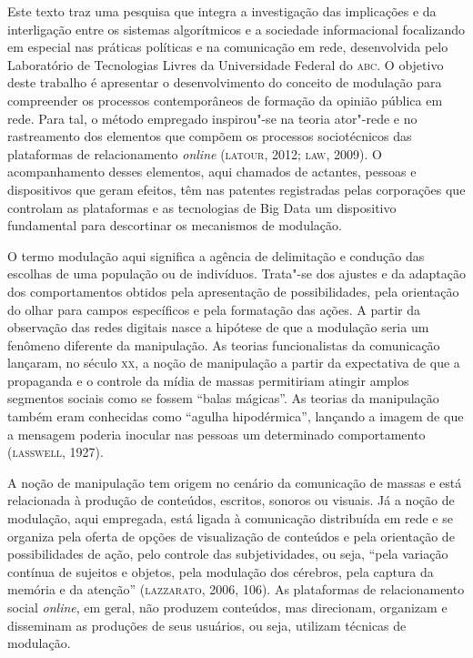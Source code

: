 \begin{flushright}
\end{flushright}

\noindent{}Este texto traz uma pesquisa que integra a investigação das implicações
e da interligação entre os sistemas algorítmicos e a sociedade
informacional focalizando em especial nas práticas políticas e na
comunicação em rede, desenvolvida pelo Laboratório de Tecnologias Livres
da Universidade Federal do \textsc{abc}. O objetivo deste trabalho é apresentar o
desenvolvimento do conceito de modulação para compreender os processos
contemporâneos de formação da opinião pública em rede. Para tal, o
método empregado inspirou"-se na teoria ator"-rede e no rastreamento dos
elementos que compõem os processos sociotécnicos das plataformas de
relacionamento \emph{online} (\textsc{latour}, 2012; \textsc{law}, 2009). O acompanhamento
desses elementos, aqui chamados de actantes, pessoas e dispositivos que
geram efeitos, têm nas patentes registradas pelas corporações que
controlam as plataformas e as tecnologias de Big Data um dispositivo
fundamental para descortinar os mecanismos de modulação.

O termo modulação aqui significa a agência de delimitação e condução das
escolhas de uma população ou de indivíduos. Trata"-se dos ajustes e da
adaptação dos comportamentos obtidos pela apresentação de
possibilidades, pela orientação do olhar para campos específicos e pela
formatação das ações. A partir da observação das redes digitais nasce a
hipótese de que a modulação seria um fenômeno diferente da manipulação.
As teorias funcionalistas da comunicação lançaram, no século \textsc{xx}, a noção
de manipulação a partir da expectativa de que a propaganda e o controle
da mídia de massas permitiriam atingir amplos segmentos sociais como se
fossem ``balas mágicas''. As teorias da manipulação também eram
conhecidas como ``agulha hipodérmica'', lançando a imagem de que a
mensagem poderia inocular nas pessoas um determinado comportamento
(\textsc{lasswell}, 1927).

A noção de manipulação tem origem no cenário da comunicação de massas e
está relacionada à produção de conteúdos, escritos, sonoros ou visuais.
Já a noção de modulação, aqui empregada, está ligada à comunicação
distribuída em rede e se organiza pela oferta de opções de visualização
de conteúdos e pela orientação de possibilidades de ação, pelo controle
das subjetividades, ou seja, ``pela variação contínua de sujeitos e
objetos, pela modulação dos cérebros, pela captura da memória e da
atenção'' (\textsc{lazzarato}, 2006, 106). As plataformas de relacionamento
social \emph{online}, em geral, não produzem conteúdos, mas direcionam,
organizam e disseminam as produções de seus usuários, ou seja, utilizam
técnicas de modulação.

